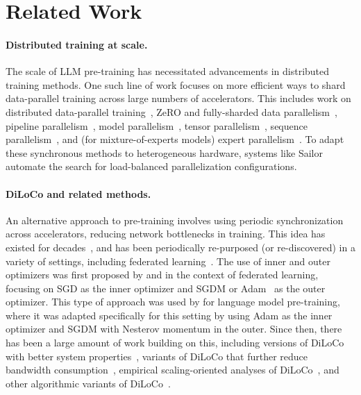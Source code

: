 \documentclass[11pt, a4paper, twocolumn, copyright, google]{google}
\begin{document}


\clearpage
\appendix


\section{Related Work}\label{sec:related_work}


\paragraph{Distributed training at scale.} The scale of LLM pre-training has necessitated advancements in distributed training methods. One such line of work focuses on more efficient ways to shard data-parallel training across large numbers of accelerators. This includes work on distributed data-parallel training~\citep{shazeer2018mesh, li2020pytorch}, ZeRO and fully-sharded data parallelism~\citep{rajbhandari2020zero,ren2021zero,FairScale2021,zhao2023pytorch}, pipeline parallelism~\citep{petrowski1993performance,huang2019gpipe,narayanan2019pipedream}, model parallelism~\citep{dean2012large}, tensor parallelism~\citep{narayanan2021efficient,korthikanti2023reducing}, sequence parallelism~\citep{korthikanti2023reducing}, and (for mixture-of-experts models) expert parallelism~\citep{lepikhingshard}. To adapt these synchronous methods to heterogeneous hardware, systems like Sailor \citep{strati2025sailorautomatingdistributedtraining} automate the search for load-balanced parallelization configurations.

\paragraph{DiLoCo and related methods.} An alternative approach to pre-training involves using periodic synchronization across accelerators, reducing network bottlenecks in training. This idea has existed for decades~\citep{mangasarian1993backpropagation}, and has been periodically re-purposed (or re-discovered) in a variety of settings, including federated learning~\citep{zinkevich2010parallelized, mcmahan2017communication, stich2018local}. The use of inner and outer optimizers was first proposed by \citet{hsu2019measuring} and \citet{reddi2021adaptive} in the context of federated learning, focusing on SGD as the inner optimizer and SGDM or Adam~\citep{kingma2014adam} as the outer optimizer. This type of approach was used by \citet{douillard2023diloco} for language model pre-training, where it was adapted specifically for this setting by using Adam as the inner optimizer and SGDM with Nesterov momentum in the outer. Since then, there has been a large amount of work building on this, including versions of DiLoCo with better system properties~\citep{liu2024asynchronous,kale2025eager,qi2025dilocox,kim2025halos}, variants of DiLoCo that further reduce bandwidth consumption~\citep{douillard2025streaming,beton2025improving,sarfi2025communication}, empirical scaling-oriented analyses of DiLoCo~\citep{charles2025communication,therien2025muloco}, and other algorithmic variants of DiLoCo~\citep{sani2024photon,therien2025muloco,kolehmainen2025noloco,sarfi2025communication,fan2025pier,lidin2026covenant72bpretraining72bllm}.
\end{document}
